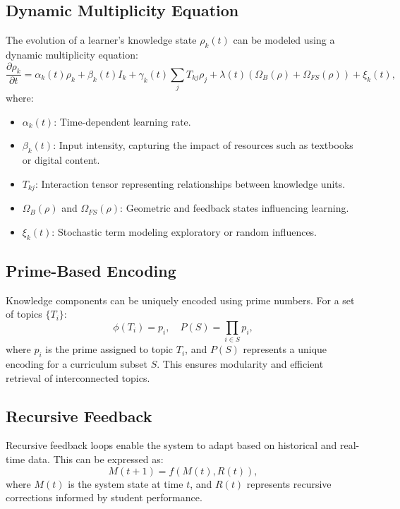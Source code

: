 \documentclass{article}
\theoremstyle{plain}
\begin{document}
\subsection{Dynamic Multiplicity Equation}
The evolution of a learner's knowledge state \( \rho_k(t) \) can be modeled using a dynamic multiplicity equation:
\begin{equation}
\frac{\partial \rho_k}{\partial t} = \alpha_k(t) \rho_k + \beta_k(t) I_k + \gamma_k(t) \sum_j T_{kj} \rho_j + \lambda(t)(\Omega_B(\rho) + \Omega_{FS}(\rho)) + \xi_k(t),
\label{eq:dynamic}
\end{equation}
where:
\begin{itemize}
    \item \( \alpha_k(t) \): Time-dependent learning rate.
    \item \( \beta_k(t) \): Input intensity, capturing the impact of resources such as textbooks or digital content.
    \item \( T_{kj} \): Interaction tensor representing relationships between knowledge units.
    \item \( \Omega_B(\rho) \) and \( \Omega_{FS}(\rho) \): Geometric and feedback states influencing learning.
    \item \( \xi_k(t) \): Stochastic term modeling exploratory or random influences.
\end{itemize}

\subsection{Prime-Based Encoding}
Knowledge components can be uniquely encoded using prime numbers. For a set of topics \( \{T_i\} \):
\begin{equation}
\phi(T_i) = p_i, \quad P(S) = \prod_{i \in S} p_i,
\label{eq:prime_encoding}
\end{equation}
where \( p_i \) is the prime assigned to topic \( T_i \), and \( P(S) \) represents a unique encoding for a curriculum subset \( S \). This ensures modularity and efficient retrieval of interconnected topics.

\subsection{Recursive Feedback}
Recursive feedback loops enable the system to adapt based on historical and real-time data. This can be expressed as:
\begin{equation}
M(t+1) = f(M(t), R(t)),
\end{equation}
where \( M(t) \) is the system state at time \( t \), and \( R(t) \) represents recursive corrections informed by student performance.
\end{document}
